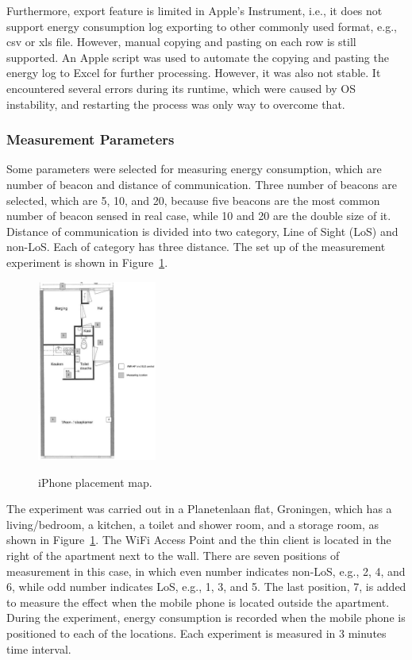 \documentclass[journal]{vgtc}                %
\begin{document}
Furthermore, export feature is limited in Apple's Instrument, i.e., it does not support energy consumption log exporting to other commonly used format, e.g., csv or xls file. However, manual copying and pasting on each row is still supported. An Apple script was used to automate the copying and pasting the energy log to Excel for further processing. However, it was also not stable. It encountered several errors during its runtime, which were caused by OS instability, and restarting the process was only way to overcome that.

\subsubsection{Measurement Parameters} %
\label{ssub:measurement_parameters}
Some parameters were selected for measuring energy consumption, which are number of beacon and distance of communication. Three number of beacons are selected, which are 5, 10, and 20, because five beacons are the most common number of beacon sensed in real case, while 10 and 20 are the double size of it. Distance of communication is divided into two category, Line of Sight (LoS) and non-LoS. Each of category has three distance. The set up of the measurement experiment is shown in Figure~\ref{fig:experiment-map}.

\begin{figure}
  \caption{iPhone placement map.}
  \centering
    \includegraphics[width=0.35\textwidth]{experiment-map}
  \label{fig:experiment-map}
\end{figure}

The experiment was carried out in a Planetenlaan flat, Groningen, which has a living/bedroom, a kitchen, a toilet and shower room, and a storage room, as shown in Figure~\ref{fig:experiment-map}. The WiFi Access Point and the thin client is located in the right of the apartment next to the wall. There are seven positions of measurement in this case, in which even number indicates non-LoS, e.g., 2, 4, and 6, while odd number indicates LoS, e.g., 1, 3, and 5. The last position, 7, is added to measure the effect when the mobile phone is located outside the apartment. During the experiment, energy consumption is recorded when the mobile phone is positioned to each of the locations. Each experiment is measured in 3 minutes time interval.
\end{document}
